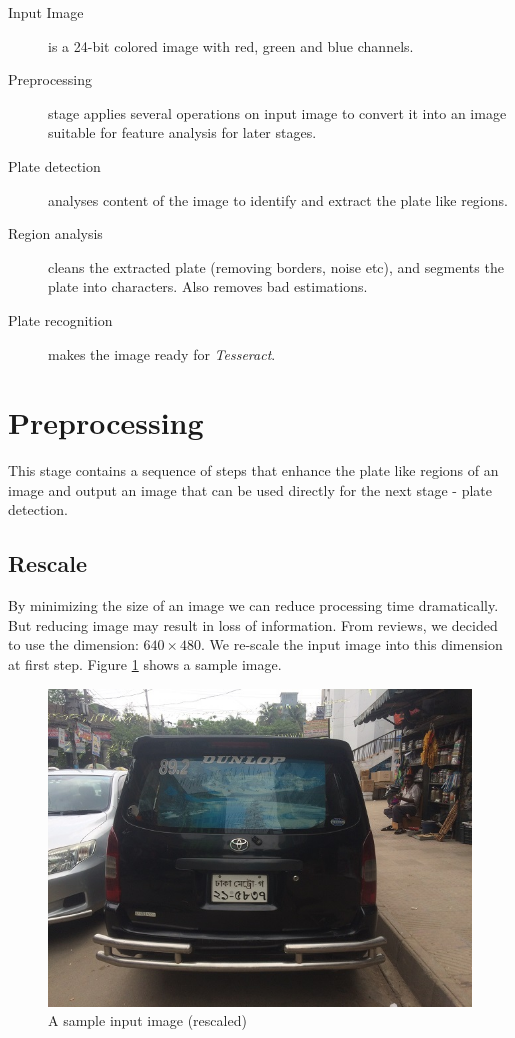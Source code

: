 \documentclass{standalone}
\begin{document}
\begin{description}
\item [Input Image] is a 24-bit colored image with red, green and blue channels.
\item [Preprocessing] stage applies several operations on input image to convert it into an image suitable for feature analysis for later stages.
\item [Plate detection] analyses content of the image to identify and extract the plate like regions.
\item [Region analysis] cleans the extracted plate (removing borders, noise etc), and segments the plate into characters. Also removes bad estimations.
\item [Plate recognition] makes the image ready for {\it Tesseract}.
\end{description}








\section{Preprocessing}
This stage contains a sequence of steps that enhance the plate like regions of an image and output an image that can be used directly for the next stage - plate detection.

\subsection{Rescale}
By minimizing the size of an image we can reduce processing time dramatically. But reducing image may result in loss of information. From reviews, we decided to use the dimension: $640 \times 480$. We re-scale the input image into this dimension at first step. Figure \ref{fig:RescaledSample} shows a sample image.
\begin{figure} 
	\centering
	\includegraphics[width=.8\linewidth]{./img/sample/stage0.jpg}
	\caption{A sample input image (rescaled)}
	\label{fig:RescaledSample}
\end{figure}
\end{document}
